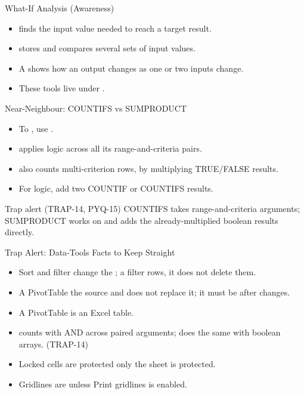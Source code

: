 \documentclass[aspectratio=169]{beamer}
\begin{document}
\begin{frame}{What-If Analysis (Awareness)}
  \begin{itemize}
    \item {} finds the input value needed to reach a target result.
    \item {} stores and compares several sets of input
      values.
    \item A  shows how an output changes as one or two inputs
      change.
    \item These tools live under .
  \end{itemize}
\end{frame}

\begin{frame}{Near-Neighbour: COUNTIFS vs SUMPRODUCT}
  \begin{itemize}
    \item To , use
      .
    \item {} applies  logic across all its
      range-and-criteria pairs.
    \item {} also counts
      multi-criterion rows, by multiplying TRUE/FALSE results.
    \item For  logic, add two COUNTIF or COUNTIFS results.
  \end{itemize}
  \begin{alertblock}{Trap alert (TRAP-14, PYQ-15)}
    COUNTIFS takes  range-and-criteria arguments; SUMPRODUCT works
    on  and adds the already-multiplied boolean results directly.
  \end{alertblock}
\end{frame}

\begin{frame}{Trap Alert: Data-Tools Facts to Keep Straight}
  \begin{itemize}
    \item Sort and filter change the ; a filter  rows, it
      does not delete them.
    \item A PivotTable  the source and does not replace it; it
      must be  after changes.
    \item A PivotTable is  an Excel table.
    \item {} counts with AND across paired arguments; 
      does the same with boolean arrays. (TRAP-14)
    \item Locked cells are protected only  the sheet is protected.
    \item Gridlines are  unless Print gridlines is enabled.
  \end{itemize}
\end{frame}
\end{document}
